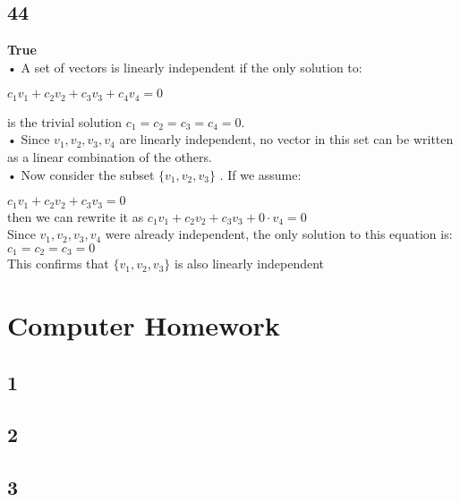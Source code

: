\documentclass{article}
\begin{document}
\subsection*{44}
\textbf{True}
\\ 	•	A set of vectors is linearly independent if the only solution to:

$c_1 v_1 + c_2 v_2 + c_3 v_3 + c_4 v_4 = 0$

is the trivial solution  $c_1 = c_2 = c_3 = c_4 = 0 $.
	\\•	Since  $v_1, v_2, v_3, v_4 $ are linearly independent, no vector in this set can be written as a linear combination of the others.
	\\•	Now consider the subset  $\{ v_1, v_2, v_3 \}$ . If we assume:

$c_1 v_1 + c_2 v_2 + c_3 v_3 = 0$\\
then we can rewrite it as $c_1 v_1 + c_2 v_2 + c_3 v_3 + 0 \cdot v_4 = 0$\\
Since  $v_1, v_2, v_3, v_4 $ were already independent, the only solution to this equation is:\\
$c_1 = c_2 = c_3 = 0$\\
This confirms that  $\{ v_1, v_2, v_3 \}$  is also linearly independent
\section*{Computer Homework}
\subsection*{1}
\subsection*{2}
\subsection*{3}
\end{document}
